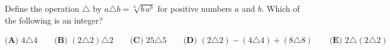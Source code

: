 Define the operation $\triangle$ by $a \triangle b = \sqrt[b]{b\,a^b}$ for positive numbers $a$ and $b$. Which of the following is an integer?

$\textbf{(A) } 4 \triangle 4 \qquad \textbf{(B) } (2 \triangle 2) \triangle 2 \qquad \textbf{(C) } 25 \triangle 5 \qquad \textbf{(D) } (2 \triangle 2) - (4 \triangle 4) + (8 \triangle 8) \qquad \textbf{(E) } 2 \triangle (2 \triangle 2)$
